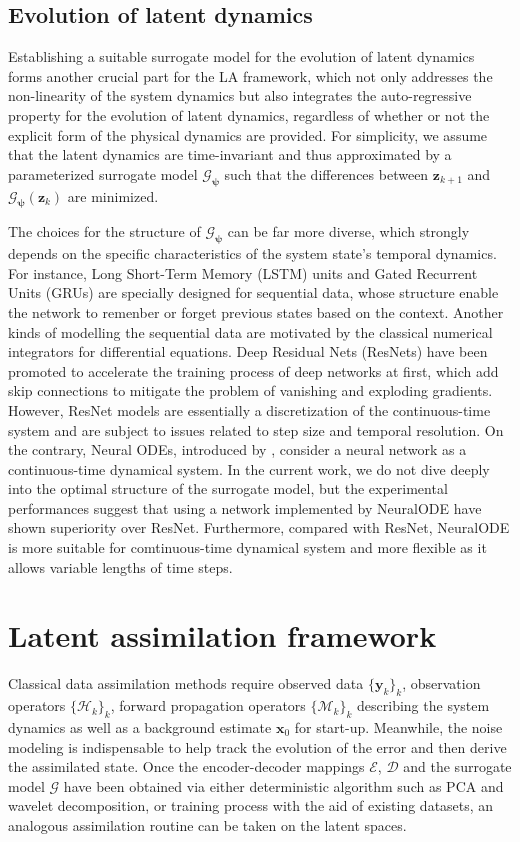 \documentclass{article}
\newcommand{\mM}{\mathcal{M}}
\newcommand{\mH}{\mathcal{H}}
\newcommand{\mE}{\mathcal{E}}
\newcommand{\mD}{\mathcal{D}}
\newcommand{\mG}{\mathcal{G}}
\begin{document}
\subsection{Evolution of latent dynamics}
Establishing a suitable surrogate model for the evolution of latent dynamics forms another crucial part for the LA framework, which not only addresses the non-linearity of the system dynamics but also integrates the auto-regressive property for the evolution of latent dynamics, regardless of whether or not the explicit form of the physical dynamics are provided. For simplicity, we assume that the latent dynamics are time-invariant and thus approximated by a parameterized surrogate model $\mG_{\bm\psi}$ such that the differences between $\bm z_{k+1}$ and $\mG_{\bm\psi}(\bm z_{k})$ are minimized.

The choices for the structure of $\mG_{\bm\psi}$ can be far more diverse, which strongly depends on the specific characteristics of the system state's temporal dynamics. For instance, Long Short-Term Memory (LSTM)\cite{LSTM} units and Gated Recurrent Units (GRUs)\cite{GRU} are specially designed for sequential data, whose structure enable the network to remenber or forget previous states based on the context. Another kinds of modelling the sequential data are motivated by the classical numerical integrators for differential equations. Deep Residual Nets (ResNets)\cite{He2015ResNet} have been promoted to accelerate the training process of deep networks at first, which add skip connections to mitigate the problem of vanishing and exploding gradients. However, ResNet models are essentially a discretization of the continuous-time system and are subject to issues related to step size and temporal resolution. On the contrary, Neural ODEs, introduced by \cite{chen2018NeuralODE,chen2021eventfn}, consider a neural network as a continuous-time dynamical system. In the current work, we do not dive deeply into the optimal structure of the surrogate model, but the experimental performances suggest that using a network implemented by NeuralODE \cite{chen2018NeuralODE,chen2021eventfn} have shown superiority over ResNet. Furthermore, compared with ResNet, NeuralODE is more suitable for comtinuous-time dynamical system and more flexible as it allows variable lengths of time steps.
\section{Latent assimilation framework}
Classical data assimilation methods require observed data $\{\bm y_k\}_k$, observation operators $\{\mH_k\}_k$, forward propagation operators $\{\mM_k\}_k$ describing the system dynamics as well as a background estimate $\bm x_0$ for start-up. Meanwhile, the noise modeling is indispensable to help track the evolution of the error and then derive the assimilated state. Once the encoder-decoder mappings $\mE$, $\mD$ and the surrogate model $\mG$ have been obtained via either deterministic algorithm such as PCA and wavelet decomposition, or training process with the aid of existing datasets, an analogous assimilation routine can be taken on the latent spaces.
\end{document}
